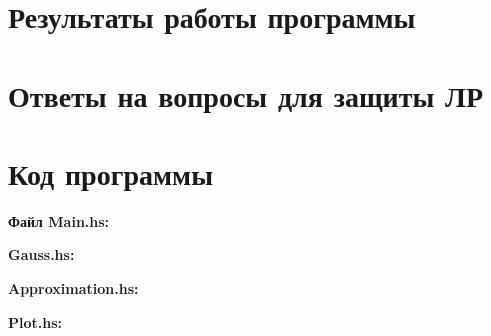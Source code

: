 \documentclass[a4paper,12pt]{article}
\begin{document}
\clearpage %

\section{Результаты работы программы}

\section{Ответы на вопросы для защиты ЛР}

\section{Код программы}
\noindent\textbf{Файл Main.hs:}


\noindent\textbf{ Gauss.hs:}


\noindent\textbf{ Approximation.hs:}


\noindent\textbf{ Plot.hs:}

\end{document}
